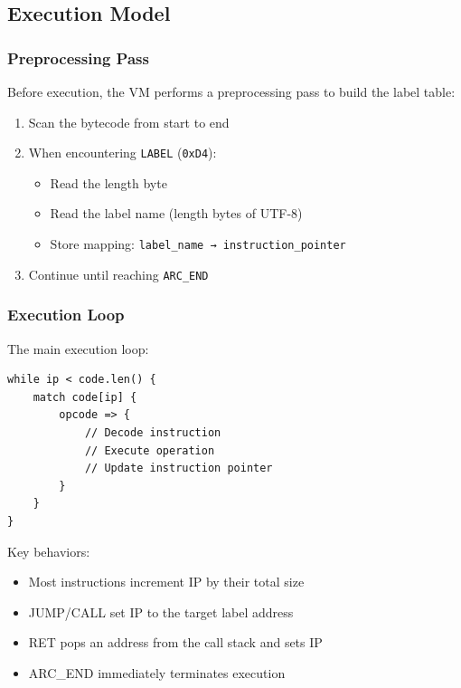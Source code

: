\documentclass[11pt,a4paper]{article}
\begin{document}
\subsection{Execution Model}

\subsubsection{Preprocessing Pass}

Before execution, the VM performs a preprocessing pass to build the label table:

\begin{enumerate}
    \item Scan the bytecode from start to end
    \item When encountering \texttt{LABEL} (\texttt{0xD4}):
    \begin{itemize}
        \item Read the length byte
        \item Read the label name (length bytes of UTF-8)
        \item Store mapping: \texttt{label\_name → instruction\_pointer}
    \end{itemize}
    \item Continue until reaching \texttt{ARC\_END}
\end{enumerate}

\subsubsection{Execution Loop}

The main execution loop:

\begin{lstlisting}[style=rustcode]
while ip < code.len() {
    match code[ip] {
        opcode => {
            // Decode instruction
            // Execute operation
            // Update instruction pointer
        }
    }
}
\end{lstlisting}

Key behaviors:
\begin{itemize}
    \item Most instructions increment IP by their total size
    \item JUMP/CALL set IP to the target label address
    \item RET pops an address from the call stack and sets IP
    \item ARC\_END immediately terminates execution
\end{itemize}
\end{document}
